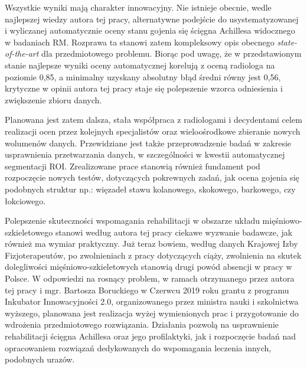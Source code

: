 Wszystkie wyniki mają charakter innowacyjny. Nie istnieje obecnie, wedle najlepszej wiedzy autora tej pracy, alternatywne podejście do usystematyzowanej i wyliczanej automatycznie oceny stanu gojenia się ścięgna Achillesa widocznego w badaniach RM. Rozprawa ta stanowi zatem kompleksowy opis obecnego \textit{state-of-the-art} dla przedmiotowego problemu. Biorąc pod uwagę, że w przedstawionym stanie najlepsze wyniki oceny automatycznej korelują z oceną radiologa na poziomie 0,85, \linebreak a minimalny uzyskany absolutny błąd średni równy jest 0,56, krytyczne w opinii autora tej pracy staje się polepszenie wzorca odniesienia i zwiększenie zbioru danych. 

Planowana jest zatem dalsza, stała współpraca z radiologami i decydentami celem realizacji ocen przez kolejnych specjalistów oraz wieloośrodkowe zbieranie nowych wolumenów danych. Przewidziane jest także przeprowadzenie badań w zakresie usprawnienia przetwarzania danych, w szczególności w kwestii automatycznej segmentacji ROI. Zrealizowane prace stanowią również fundament pod rozpoczęcie nowych testów, dotyczących pokrewnych zadań, jak ocena gojenia się podobnych struktur np.: więzadeł stawu kolanowego, skokowego, barkowego, czy łokciowego. 

Polepszenie skuteczności wspomagania rehabilitacji w obszarze układu mięśniowo-szkieletowego stanowi według autora tej pracy ciekawe wyzwanie badawcze, jak również ma wymiar praktyczny. Już teraz bowiem, według danych Krajowej Izby Fizjoterapeutów, po zwolnieniach z pracy dotyczących ciąży, zwolnienia na skutek dolegliwości mięśniowo-szkieletowych stanowią drugi powód absencji w pracy w Polsce. \linebreak W odpowiedzi na rosnący problem, w ramach otrzymanego przez autora tej pracy i mgr. Bartosza Boruckiego w Czerwcu 2019 roku grantu z programu Inkubator Innowacyjności 2.0, organizowanego przez ministra nauki i szkolnictwa wyższego, planowana jest realizacja wyżej wymienionych prac i przygotowanie do wdrożenia przedmiotowego rozwiązania. Działania pozwolą na usprawnienie rehabilitacji ścięgna Achillesa oraz jego profilaktyki, jak i rozpoczęcie badań nad opracowaniem rozwiązań dedykowanych do wspomagania leczenia innych, podobnych urazów.






